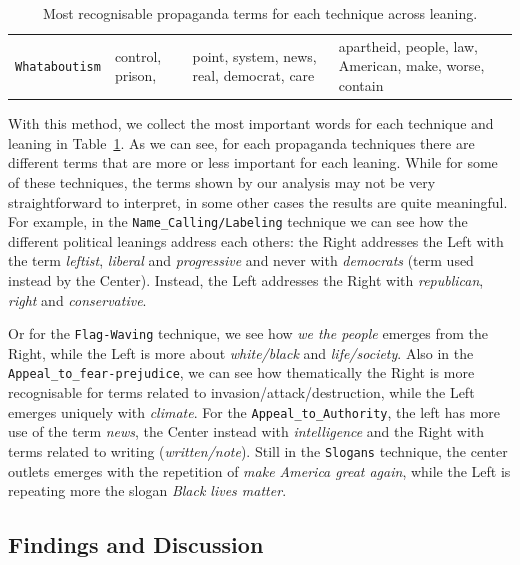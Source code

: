 \begin{table}[!htbp]
{\begin{tabular}{p{}|p{}|p{}|p{}}
            \hline
            \texttt{Whataboutism}                                    & control, prison,                                                              & point, system, news, real, democrat, care                                                                                               & apartheid, people, law, American, make, worse, contain                               \\
        \end{tabular}
    }
    \caption{Most recognisable propaganda terms for each technique across leaning.}
    \label{tab:prop_words_by_technique_and_leaning}
\end{table}

With this method, we collect the most important words for each technique and leaning in Table~\ref{tab:prop_words_by_technique_and_leaning}.
%
As we can see, for each propaganda techniques there are different terms that are more or less important for each leaning.
While for some of these techniques, the terms shown by our analysis may not be very straightforward to interpret,
in some other cases the results are quite meaningful.
For example, in the \texttt{Name\_Calling/Labeling} technique we can see how the different political leanings address each others: the Right addresses the Left with the term \emph{leftist}, \emph{liberal} and \emph{progressive} and never with \emph{democrats} (term used instead by the Center). Instead, the Left addresses the Right with \emph{republican}, \emph{right} and \emph{conservative}.

Or for the \texttt{Flag-Waving} technique, we see how \emph{we the people} emerges from the Right, while the Left is more about \emph{white/black} and \emph{life/society}.
Also in the \texttt{Appeal\_to\_fear-prejudice}, we can see how thematically the Right is more recognisable for terms related to invasion/attack/destruction, while the Left emerges uniquely with \emph{climate}.
For the \texttt{Appeal\_to\_Authority}, the left has more use of the term \emph{news}, the Center instead with \emph{intelligence} and the Right with terms related to writing (\emph{written/note}).
Still in the \texttt{Slogans} technique, the center outlets emerges with the repetition of \emph{make America great again}, while the Left is repeating more the slogan \emph{Black lives matter}.

\subsection{Findings and Discussion}

